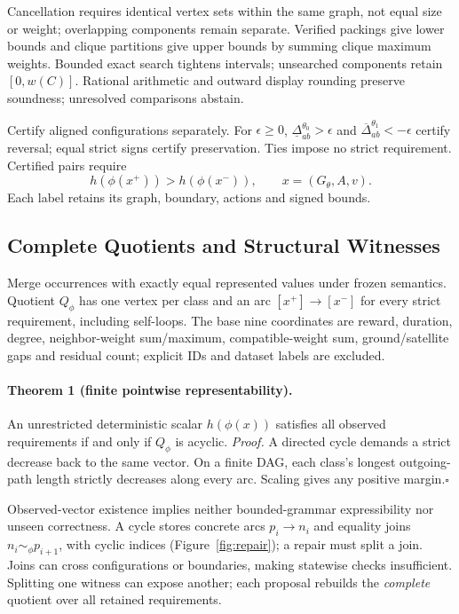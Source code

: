 Cancellation requires identical vertex sets within the same graph, not equal
size or weight; overlapping components remain separate. Verified packings
give lower bounds and clique partitions give upper bounds by summing clique
maximum weights. Bounded exact search tightens intervals; unsearched components
retain $[0,w(C)]$. Rational arithmetic and outward display rounding preserve
soundness; unresolved comparisons abstain.

Certify aligned configurations separately. For $\epsilon\geq0$,
$\underline\Delta^{\theta_0}_{ab}>\epsilon$ and
$\overline\Delta^{\theta_1}_{ab}<-\epsilon$ certify reversal; equal strict
signs certify preservation. Ties impose no strict requirement. Certified pairs
require
\begin{equation}
 h(\phi(x^+))>h(\phi(x^-)),\qquad x=(G_\theta,A,v).
 \label{eq:strict-requirement}
\end{equation}
Each label retains its graph, boundary, actions and signed bounds.

\subsection{Complete Quotients and Structural Witnesses}
\label{sec:method:repair}
Merge occurrences with exactly equal represented values under frozen
semantics. Quotient $Q_\phi$ has one vertex per class and an arc
$[x^+]\to[x^-]$ for every strict requirement, including self-loops.
The base nine coordinates are reward, duration, degree, neighbor-weight
sum/maximum, compatible-weight sum, ground/satellite gaps and residual count;
explicit IDs and dataset labels are excluded.

\paragraph{Theorem 1 (finite pointwise representability).}
An unrestricted deterministic scalar $h(\phi(x))$ satisfies all observed
requirements if and only if $Q_\phi$ is acyclic.
\emph{Proof.} A directed cycle demands a strict decrease back to the same
vector. On a finite DAG, each class's longest outgoing-path length strictly
decreases along every arc. Scaling gives any positive margin.\hfill$\square$

Observed-vector existence implies neither bounded-grammar expressibility
nor unseen correctness. A cycle stores concrete
arcs $p_i\to n_i$ and equality joins $n_i\sim_\phi p_{i+1}$, with cyclic
indices (Figure~\ref{fig:repair}); a repair must split a join. Joins can cross
configurations or boundaries, making statewise checks insufficient. Splitting
one witness can expose another; each proposal rebuilds the \emph{complete}
quotient over all retained requirements.

